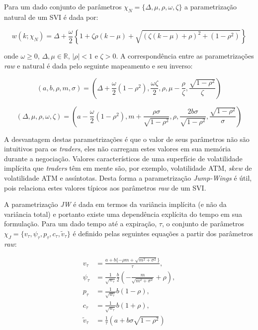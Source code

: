 \documentclass[]{book}
\theoremstyle{definition}
\theoremstyle{definition}
\theoremstyle{definition}
\theoremstyle{remark}
\begin{document}
Para um dado conjunto de parâmetros
\(\chi_N=\{\Delta, \mu, \rho, \omega, \zeta\}\) a parametrização natural
de um SVI é dada por:

\begin{equation}
w(k; \chi_N)=\Delta+\frac{\omega}{2}\left\lbrace 1+\zeta\rho(k-\mu)+\sqrt{(\zeta(k-\mu)+\rho)^2+(1-\rho^2)} \right\rbrace
\label{eq:svi-natural}
\end{equation}

onde \(\omega\geq 0\), \(\Delta, \mu \in \mathbb R\), \(|\rho|<1\) e
\(\zeta>0\). A correspondência entre as parametrizações \emph{raw} e
natural é dada pelo seguinte mapeamento e seu inverso:

\begin{equation}
(a, b, \rho, m, \sigma)=\left(\Delta+\frac{\omega}{2}(1-\rho^2), \frac{\omega\zeta}{2}, \rho, \mu-\frac{\rho}{\zeta}, \frac{\sqrt{1-\rho^2}}{\zeta}\right)
\label{eq:natural-to-raw}
\end{equation}

\begin{equation}
(\Delta, \mu, \rho, \omega, \zeta)=\left(a-\frac{\omega}{2}(1-\rho^2), m+\frac{\rho\sigma}{\sqrt{1-\rho^2}}, \rho, \frac{2b\sigma}{\sqrt{1-\rho^2}}, \frac{\sqrt{1-\rho^2}}{\sigma}\right)
\label{eq:raw-to-natural}
\end{equation}

A desvantagem destas parametrizações é que o valor de seus parâmetros
não são intuitivos para os \emph{traders}, eles não carregam estes
valores em sua memória durante a negociação. Valores característicos de
uma superfície de volatilidade implícita que \emph{traders} têm em mente
são, por exemplo, volatilidade ATM, \emph{skew} de volatilidade ATM e
assíntotas. Desta forma a parametrização \emph{Jump-Wings} é útil, pois
relaciona estes valores típicos aos parâmetros \emph{raw} de um SVI.

A parametrização \emph{JW} é dada em termos da variância implícita (e
não da variância total) e portanto existe uma dependência explícita do
tempo em sua formulação. Para um dado tempo até a expiração, \(\tau\), o
conjunto de parâmetros
\(\chi_{J}=\{v_\tau, \psi_\tau, p_\tau, c_\tau, \tilde v_\tau\}\) é
definido pelas seguintes equações a partir dos parâmetros \emph{raw}:

\begin{align}
v_\tau&=\frac{a+b\{-\rho m + \sqrt{m^2+\sigma^2}\}}{\tau},\\
\psi_\tau&=\frac{1}{\sqrt{w_\tau}}\frac{b}{2}\left(-\frac{m}{\sqrt{m^2+\sigma^2}}+\rho\right),\\
p_\tau&=\frac{1}{\sqrt{w_\tau}}b(1-\rho),\\
c_\tau&=\frac{1}{\sqrt{w_\tau}}b(1+\rho),\\
\tilde v_\tau&=\frac{1}{\tau}\left(a+b\sigma\sqrt{1-\rho^2}\right)
\label{eq:raw-to-jw}
\end{align}
\end{document}
